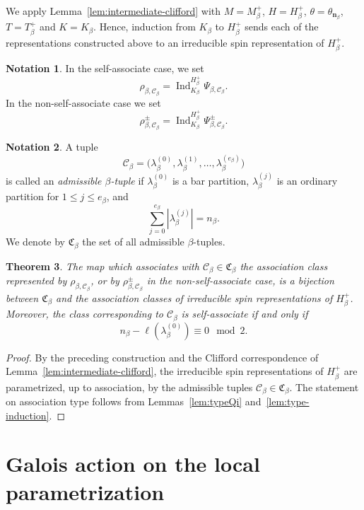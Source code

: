 \documentclass[reqno]{amsart}
\DeclareMathOperator{\Ind}{Ind}
\newtheorem{theorem}{Theorem}[section] %
\theoremstyle{definition}
\newtheorem{notation}[theorem]{Notation}
\begin{document}
We apply Lemma~\ref{lem:intermediate-clifford} with $ M=M_\beta^+$, $
H=H_\beta^+$, $\theta=\theta_{\mathbf n_\beta}$, $T=T_\beta^+$ and $
K=K_\beta$.
Hence, induction from $K_\beta$ to $H_\beta^+$ sends each of the representations
constructed above to an irreducible spin representation of $H_\beta^+$.
\begin{notation}
\label{not:RiQi}
In the self-associate case, we set
\[
\rho_{\beta,\mathcal C_\beta}
=
\Ind_{K_\beta}^{H_\beta^+}\Psi_{\beta,\mathcal C_\beta}.
\]
In the non-self-associate case we set
\[
\rho_{\beta,\mathcal C_\beta}^\pm
=
\Ind_{K_\beta}^{H_\beta^+}\Psi_{\beta,\mathcal C_\beta}^\pm.
\]
\end{notation}

\begin{notation}
\label{not:admissible-beta-tuples}
A tuple
\[
\mathcal C_\beta
=
\bigl(
\lambda_\beta^{(0)},\lambda_\beta^{(1)},\ldots,
\lambda_\beta^{(e_\beta)}
\bigr)
\]
is called an \emph{admissible $\beta$-tuple} if $\lambda_\beta^{(0)}$ is a
bar partition, $\lambda_\beta^{(j)}$ is an ordinary partition for $1\leq
j\leq e_\beta$, and
\[
\sum_{j=0}^{e_\beta}|\lambda_\beta^{(j)}|=n_\beta.
\]
We denote by $\mathfrak C_\beta$ the set of all admissible
$\beta$-tuples.
\end{notation}

\begin{theorem}
\label{thm:param-level}
The map which associates with $ \mathcal C_\beta\in\mathfrak C_\beta $ the
association class represented by $\rho_{\beta,\mathcal C_\beta}$, or by
$\rho_{\beta,\mathcal C_\beta}^\pm$ in the non-self-associate case, is a
bijection between $\mathfrak C_\beta$ and the association classes of
irreducible spin representations of $H_\beta^+$. Moreover, the class
corresponding to $\mathcal C_\beta$ is self-associate if and only if
\[
n_\beta-\ell(\lambda_\beta^{(0)})\equiv0\mod2.
\]
\end{theorem}
\begin{proof}
By the preceding construction and the Clifford correspondence of
Lemma~\ref{lem:intermediate-clifford}, the irreducible spin representations
of $H_\beta^+$ are parametrized, up to association, by the admissible tuples
$\mathcal C_\beta\in\mathfrak C_\beta$. The statement on association type
follows from Lemmas~\ref{lem:typeQi} and~\ref{lem:type-induction}.
\end{proof}
 

\section{Galois action on the local parametrization}
\label{sec:galois-local}
\end{document}
